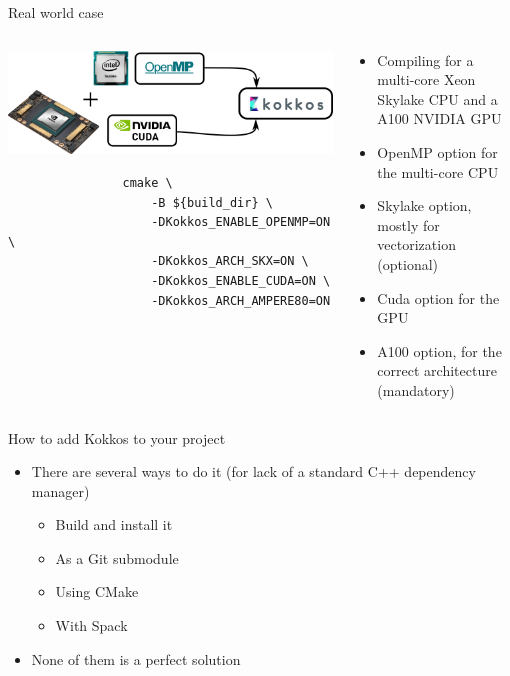 \documentclass[
    aspectratio=169,
]{beamer}
\begin{document}
\begin{frame}[fragile]{Real world case}
    \begin{columns}
        \begin{column}{0.475\linewidth}
            \begin{center}
                \includegraphics[width=\textwidth]{kokkos_a100_backend.png}
            \end{center}
            \begin{verbatim}
                cmake \
                    -B ${build_dir} \
                    -DKokkos_ENABLE_OPENMP=ON \
                    -DKokkos_ARCH_SKX=ON \
                    -DKokkos_ENABLE_CUDA=ON \
                    -DKokkos_ARCH_AMPERE80=ON
            \end{verbatim}
        \end{column}
        \begin{column}{0.525\linewidth}
            \begin{itemize}
                \item Compiling for a multi-core Xeon Skylake CPU and a A100 NVIDIA GPU
                \item OpenMP option for the multi-core CPU
                \item Skylake option, mostly for vectorization (optional)
                \item Cuda option for the GPU
                \item A100 option, for the correct architecture (mandatory)
            \end{itemize}
        \end{column}
    \end{columns}
\end{frame}


\begin{frame}{How to add Kokkos to your project}
    \begin{itemize}
        \item There are several ways to do it (for lack of a standard C++ dependency manager)
        \begin{itemize}
            \item Build and install it
            \item As a Git submodule
            \item Using CMake
            \item With Spack
        \end{itemize}
        \item None of them is a perfect solution
    \end{itemize}
\end{frame}
\end{document}

